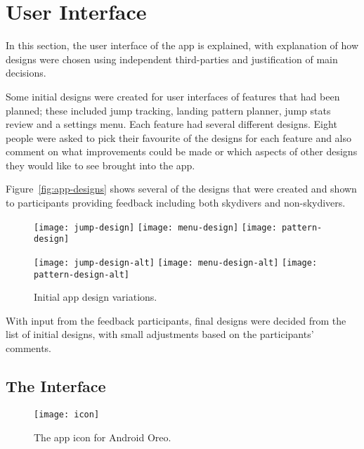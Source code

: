 \section{User Interface}\label{sec:user-interface}
In this section, the user interface of the app is explained, with explanation of how designs were chosen using independent third-parties and justification of main decisions.

Some initial designs were created for user interfaces of features that had been planned; these included jump tracking, landing pattern planner, jump stats review and a settings menu. Each feature had several different designs. Eight people were asked to pick their favourite of the designs for each feature and also comment on what improvements could be made or which aspects of other designs they would like to see brought into the app.

Figure~\vref{fig:app-designs} shows several of the designs that were created and shown to participants providing feedback including both skydivers and non-skydivers.

\begin{figure}[ht]
  \centering
  \texttt{[image: jump-design]}
  \hspace{1cm}
  \texttt{[image: menu-design]}
  \hspace{1cm}
  \texttt{[image: pattern-design]}

  \texttt{[image: jump-design-alt]}
  \hspace{1cm}
  \texttt{[image: menu-design-alt]}
  \hspace{1cm}
  \texttt{[image: pattern-design-alt]}
  \caption{Initial app design variations.}\label{fig:app-designs}
\end{figure}

With input from the feedback participants, final designs were decided from the list of initial designs, with small adjustments based on the participants' comments.

\subsection{The Interface}

\begin{wrapfigure}{}{0.2\textwidth}
  \centering
  \texttt{[image: icon]}
  \caption{The app icon for Android Oreo.}\label{fig:icon}
\end{wrapfigure}

